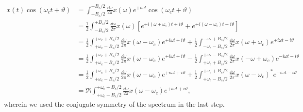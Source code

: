 \begin{equation}
	\begin{split}
		x(t)
		\cos(\omega_ct+\vartheta)
		&=
		\int_{-B_s/2}^{+B_s/2}
		\frac{\dd{\omega}}{2\pi}
		x(\omega)
		e^{+i\omega t}
		\cos(\omega_ct+\vartheta)
		\\
		&=
		\frac{1}{2}
		\int_{-B_s/2}^{+B_s/2}
		\frac{\dd{\omega}}{2\pi}
		x(\omega)
		\left[
			e^{+i(\omega+\omega_c)t+i\vartheta}
			+
			e^{+i(\omega-\omega_c)t-i\vartheta}
		\right]
		\\
		&=
		\frac{1}{2}
		\int_{+\omega_c-B_s/2}^{+\omega_c+B_s/2}
		\frac{\dd{\omega}}{2\pi}
		x(\omega-\omega_c)
		e^{+i\omega t+i\vartheta}
		+
		\frac{1}{2}
		\int_{-\omega_c-B_s/2}^{-\omega_c+B_s/2}
		\frac{\dd{\omega}}{2\pi}
		x(\omega+\omega_c)
		e^{+i\omega t-i\vartheta}
		\\
		&=
		\frac{1}{2}
		\int_{+\omega_c-B_s/2}^{+\omega_c+B_s/2}
		\frac{\dd{\omega}}{2\pi}
		x(\omega-\omega_c)
		e^{+i\omega t+i\vartheta}
		-
		\frac{1}{2}
		\int_{+\omega_c+B_s/2}^{+\omega_c-B_s/2}
		\frac{\dd{\omega}}{2\pi}
		x(-\omega+\omega_c)
		e^{-i\omega t-i\vartheta}
		\\
		&=
		\frac{1}{2}
		\int_{+\omega_c-B_s/2}^{+\omega_c+B_s/2}
		\frac{\dd{\omega}}{2\pi}
		x(\omega-\omega_c)
		e^{+i\omega t+i\vartheta}
		+
		\frac{1}{2}
		\int_{+\omega_c-B_s/2}^{+\omega_c+B_s/2}
		\frac{\dd{\omega}}{2\pi}
		x(\omega-\omega_c)^*
		e^{-i\omega t-i\vartheta}
		\\
		&=
		\Re\int_{+\omega_c-B_s/2}^{+\omega_c+B_s/2}
		\frac{\dd{\omega}}{2\pi}
		x(\omega-\omega_c)
		e^{+i\omega t+i\vartheta}
		,
	\end{split}
	\label{eq:upconversion_real}
\end{equation}
wherein we used the conjugate symmetry of the spectrum in the last step.

